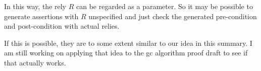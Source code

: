 \documentclass[12pt, fleqn]{article}
\begin{document}
In this way, the rely $R$ can be regarded as a parameter. So it may be
possible to generate assertions with $R$ unspecified and just check
the generated pre-condition and post-condition with actual relies.

If this is possible, they are to some extent similar to our idea in
this summary. I am still working on applying that idea to the gc
algorithm proof draft to see if that actually works.

\end{document}
